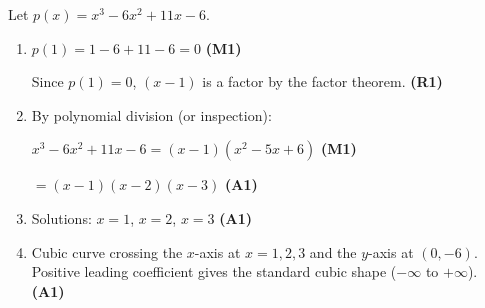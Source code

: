 \documentclass[12pt, twoside]{article}
\begin{document}
\begin{enumerate}[itemsep=0.15cm]
Let $p(x) = x^3 - 6x^2 + 11x - 6$.

\begin{enumerate}[itemsep=0.3cm]
  \item $p(1) = 1 - 6 + 11 - 6 = 0$ \hfill \textbf{(M1)}

  Since $p(1) = 0$, $(x - 1)$ is a factor by the factor theorem. \hfill \textbf{(R1)}

  \item By polynomial division (or inspection):

  $x^3 - 6x^2 + 11x - 6 = (x - 1)(x^2 - 5x + 6)$ \hfill \textbf{(M1)}

  $= (x - 1)(x - 2)(x - 3)$ \hfill \textbf{(A1)}

  \item Solutions: $x = 1$, $x = 2$, $x = 3$ \hfill \textbf{(A1)}

  \item Cubic curve crossing the $x$-axis at $x = 1, 2, 3$
  and the $y$-axis at $(0, -6)$. Positive leading coefficient
  gives the standard cubic shape ($-\infty$ to $+\infty$). \hfill \textbf{(A1)}
\end{enumerate}

\end{enumerate}
\end{document}
